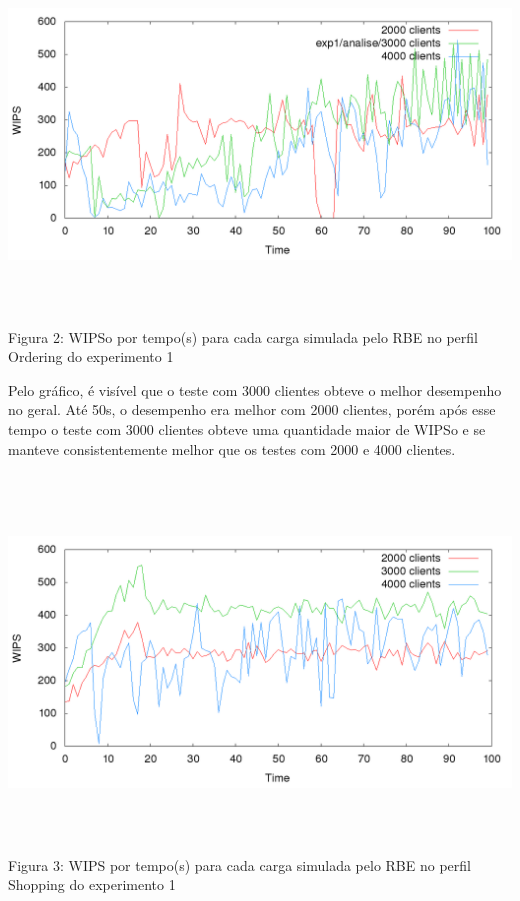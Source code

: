 \documentclass[11pt,twoside]{article}
\begin{document}
\begin{center}
\vspace{-1em}
\includegraphics[width=15cm, height=10cm]{images/exp1/plot_ordering}
Figura 2: WIPSo por tempo(s) para cada carga simulada pelo RBE no perfil Ordering do experimento 1
\end{center}
Pelo gráfico, é visível que o teste com 3000 clientes obteve o melhor desempenho no geral. Até 50s, o desempenho era melhor com 2000 clientes, porém após esse tempo o teste com 3000 clientes obteve uma quantidade maior de WIPSo e se manteve consistentemente melhor que os testes com 2000 e 4000 clientes.

\begin{center}
\includegraphics[width=15cm, height=10cm]{images/exp1/plot_shopping}
Figura 3: WIPS por tempo(s) para cada carga simulada pelo RBE no perfil Shopping do experimento 1
\end{center}
\end{document}
